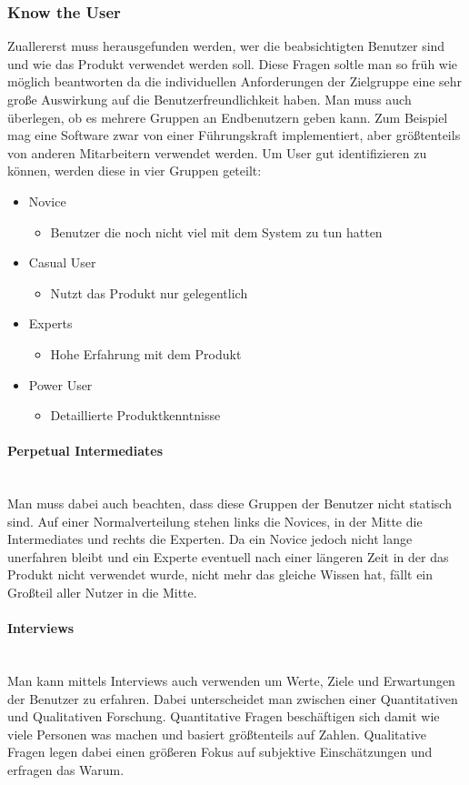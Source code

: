\documentclass{article}
\newcommand{\paragraphlb}[1]{\paragraph{#1}\mbox{}\\}
\begin{document}
	\subsubsection{Know the User}
	Zuallererst muss herausgefunden werden, wer die beabsichtigten Benutzer sind und wie das Produkt verwendet werden soll. Diese Fragen soltle man so früh wie möglich beantworten da die individuellen Anforderungen der Zielgruppe eine sehr große Auswirkung auf die Benutzerfreundlichkeit haben. Man muss auch überlegen, ob es mehrere Gruppen an Endbenutzern geben kann. Zum Beispiel mag eine Software zwar von einer Führungskraft implementiert, aber größtenteils von anderen Mitarbeitern verwendet werden. Um User gut identifizieren zu können, werden diese in vier Gruppen geteilt:
	\begin{itemize}
		\item{Novice}
		\begin{itemize}
			\item{Benutzer die noch nicht viel mit dem System zu tun hatten}
		\end{itemize}
		\item{Casual User}
		\begin{itemize}
			\item{Nutzt das Produkt nur gelegentlich}
		\end{itemize}
		\item{Experts}
		\begin{itemize}
			\item{Hohe Erfahrung mit dem Produkt}
		\end{itemize}
		\item{Power User}
		\begin{itemize}
			\item{Detaillierte Produktkenntnisse}
		\end{itemize}
	\end{itemize}
	\paragraphlb{Perpetual Intermediates}
	Man muss dabei auch beachten, dass diese Gruppen der Benutzer nicht statisch sind. Auf einer Normalverteilung stehen links die Novices, in der Mitte die Intermediates und rechts die Experten. Da ein Novice jedoch nicht lange unerfahren bleibt und ein Experte eventuell nach einer längeren Zeit in der das Produkt nicht verwendet wurde, nicht mehr das gleiche Wissen hat, fällt ein Großteil aller Nutzer in die Mitte.
	\paragraphlb{Interviews}
	Man kann mittels Interviews auch verwenden um Werte, Ziele und Erwartungen der Benutzer zu erfahren. Dabei unterscheidet man zwischen einer Quantitativen und Qualitativen Forschung. Quantitative Fragen beschäftigen sich damit wie viele Personen was machen und basiert größtenteils auf Zahlen. Qualitative Fragen legen dabei einen größeren Fokus auf subjektive Einschätzungen und erfragen das Warum.
\end{document}
